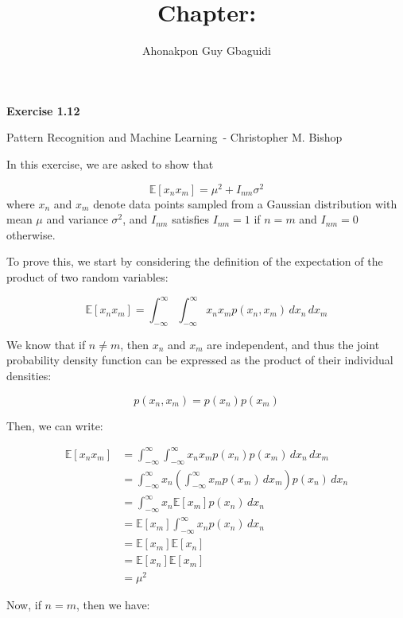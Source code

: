\documentclass{article}
\title{Chapter: \ChapterName}
\author{Ahonakpon Guy Gbaguidi}
\date{}
\newcommand{\BookName}{Pattern Recognition and Machine Learning}
\newcommand{\BookAuthor}{Christopher M. Bishop}
\newcommand{\ExerciseID}{1.12}
\begin{document}
\maketitle

\begin{center}
  \large\textbf{Exercise \ExerciseID}

  \vspace{0.5em}

  \normalsize\BookName\ - \BookAuthor
\end{center}

\begin{tcolorbox}[breakable,colback=gray!5,colframe=gray!60,title=Solution]
In this exercise, we are asked to show that

\[
\mathbb{E}[x_n x_m] = \mu^2 + I_{nm} \sigma^2
\]
where $x_n$ and $x_m$ denote data points sampled from a Gaussian distribution with mean $\mu$ and variance $\sigma^2$, and $I_{nm}$ satisfies $I_{nm} = 1$ if $n = m$ and $I_{nm} = 0$ otherwise.

To prove this, we start by considering the definition of the expectation of the product of two random variables:

\[
\mathbb{E}[x_n x_m] = \int_{-\infty}^{\infty} \int_{-\infty}^{\infty} x_n x_m p(x_n, x_m) \, dx_n \, dx_m
\]

We know that if $n \neq m$, then $x_n$ and $x_m$ are independent, and thus the joint probability density function can be expressed as the product of their individual densities:

\[
p(x_n, x_m) = p(x_n) p(x_m)
\]

Then, we can write:

\begin{align*}
\mathbb{E}[x_n x_m] 
&= \int_{-\infty}^{\infty} \int_{-\infty}^{\infty} x_n x_m p(x_n) p(x_m) \, dx_n \, dx_m \\
&= \int_{-\infty}^{\infty} x_n \left( \int_{-\infty}^{\infty} x_m p(x_m) \, dx_m \right) p(x_n) \, dx_n \\
&= \int_{-\infty}^{\infty} x_n \mathbb{E}[x_m] p(x_n) \, dx_n \\
&= \mathbb{E}[x_m] \int_{-\infty}^{\infty} x_n p(x_n) \, dx_n \\
&= \mathbb{E}[x_m] \mathbb{E}[x_n] \\
&= \mathbb{E}[x_n] \mathbb{E}[x_m] \\
&= \mu^2
\end{align*}

Now, if $n = m$, then we have:


\end{tcolorbox}
\end{document}
